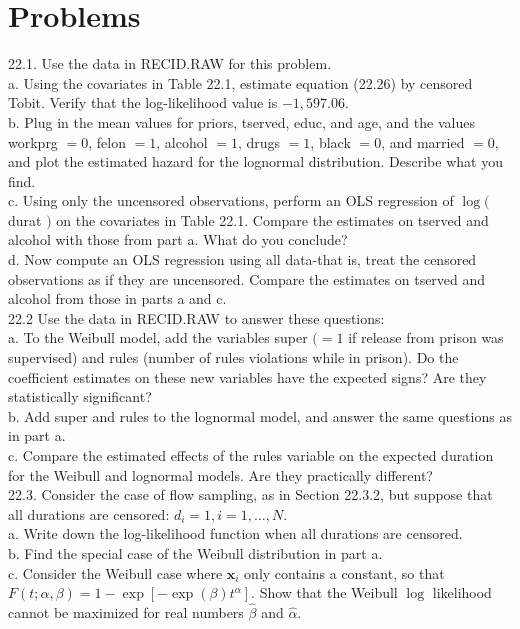 \documentclass[10pt]{article}
\begin{document}
\section*{Problems}
22.1. Use the data in RECID.RAW for this problem.\\
a. Using the covariates in Table 22.1, estimate equation (22.26) by censored Tobit. Verify that the log-likelihood value is $-1,597.06$.\\
b. Plug in the mean values for priors, tserved, educ, and age, and the values workprg $=0$, felon $=1$, alcohol $=1$, drugs $=1$, black $=0$, and married $=0$, and plot the estimated hazard for the lognormal distribution. Describe what you find.\\
c. Using only the uncensored observations, perform an OLS regression of $\log ($ durat $)$ on the covariates in Table 22.1. Compare the estimates on tserved and alcohol with those from part a. What do you conclude?\\
d. Now compute an OLS regression using all data-that is, treat the censored observations as if they are uncensored. Compare the estimates on tserved and alcohol from those in parts a and c.\\
22.2 Use the data in RECID.RAW to answer these questions:\\
a. To the Weibull model, add the variables super $(=1$ if release from prison was supervised) and rules (number of rules violations while in prison). Do the coefficient estimates on these new variables have the expected signs? Are they statistically significant?\\
b. Add super and rules to the lognormal model, and answer the same questions as in part a.\\
c. Compare the estimated effects of the rules variable on the expected duration for the Weibull and lognormal models. Are they practically different?\\
22.3. Consider the case of flow sampling, as in Section 22.3.2, but suppose that all durations are censored: $d_{i}=1, i=1, \ldots, N$.\\
a. Write down the log-likelihood function when all durations are censored.\\
b. Find the special case of the Weibull distribution in part a.\\
c. Consider the Weibull case where $\mathbf{x}_{i}$ only contains a constant, so that $F(t ; \alpha, \beta)= 1-\exp \left[-\exp (\beta) t^{\alpha}\right]$. Show that the Weibull $\log$ likelihood cannot be maximized for real numbers $\hat{\beta}$ and $\hat{\alpha}$.\\
\end{document}
